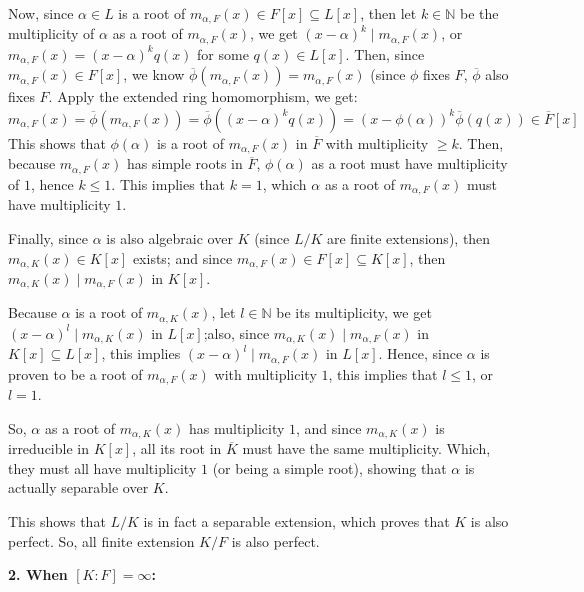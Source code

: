 \documentclass{article}
\begin{document}
Now, since $\alpha\in L$ is a root of $m_{\alpha,F}(x)\in F[x]\subseteq L[x]$, then let $k\in\mathbb{N}$ be the multiplicity of $\alpha$ as a root of $m_{\alpha,F}(x)$, we get $(x-\alpha)^k\mid m_{\alpha,F}(x)$, or $m_{\alpha,F}(x)=(x-\alpha)^kq(x)$ for some $q(x)\in L[x]$. Then, since $m_{\alpha,F}(x)\in F[x]$, we know $\overline{\phi}(m_{\alpha,F}(x)) = m_{\alpha,F}(x)$ (since $\phi$ fixes $F$, $\overline{\phi}$ also fixes $F$. Apply the extended ring homomorphism, we get:
$$m_{\alpha,F}(x)=\overline{\phi}(m_{\alpha,F}(x))=\overline{\phi}((x-\alpha)^kq(x)) = (x-\phi(\alpha))^k\overline{\phi}(q(x))\in \overline{F}[x]$$
This shows that $\phi(\alpha)$ is a root of $m_{\alpha,F}(x)$ in $\overline{F}$ with multiplicity $\geq k$. Then, because $m_{\alpha,F}(x)$ has simple roots in $\overline{F}$, $\phi(\alpha)$ as a root must have multiplicity of $1$, hence $k\leq 1$. This implies that $k=1$, which $\alpha$ as a root of $m_{\alpha,F}(x)$ must have multiplicity $1$.

\hfil

Finally, since $\alpha$ is also algebraic over $K$ (since $L/K$ are finite extensions), then $m_{\alpha, K}(x)\in K[x]$ exists; and since $m_{\alpha,F}(x)\in F[x]\subseteq K[x]$, then $m_{\alpha,K}(x)\mid m_{\alpha,F}(x)$ in $K[x]$.

Because $\alpha$ is a root of $m_{\alpha,K}(x)$, let $l\in \mathbb{N}$ be its multiplicity, we get $(x-\alpha)^l\mid m_{\alpha,K}(x)$ in $L[x]$;also, since $m_{\alpha,K}(x)\mid m_{\alpha,F}(x)$ in $K[x]\subseteq L[x]$, this implies $(x-\alpha)^l\mid m_{\alpha,F}(x)$ in $L[x]$. Hence, since $\alpha$ is proven to be a root of $m_{\alpha,F}(x)$ with multiplicity $1$, this implies that $l\leq 1$, or $l=1$.

So, $\alpha$ as a root of $m_{\alpha,K}(x)$ has multiplicity $1$, and since $m_{\alpha,K}(x)$ is irreducible in $K[x]$, all its root in $\overline{K}$ must have the same multiplicity. Which, they must all have multiplicity $1$ (or being a simple root), showing that $\alpha$ is actually separable over $K$.

This shows that $L/K$ is in fact a separable extension, which proves that $K$ is also perfect. So, all finite extension $K/F$ is also perfect.

\hfil

\textbf{2. When $[K:F]=\infty$:}



\break
\end{document}
